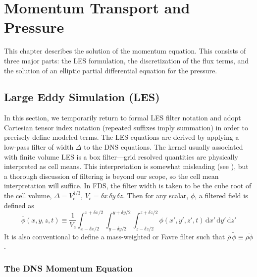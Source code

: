 \chapter{Momentum Transport and Pressure}
\label{momentum_chapter}

This chapter describes the solution of the momentum equation. This consists of three major parts: the LES formulation, the
discretization of the flux terms, and the solution of an elliptic partial differential equation for the pressure.

\section{Large Eddy Simulation (LES)}
\label{LES}

In this section, we temporarily return to formal LES filter notation and adopt Cartesian tensor index notation (repeated suffixes imply summation) in order to precisely define modeled terms. The LES equations are derived by applying a low-pass filter of width $\Delta$ to the DNS equations. The kernel usually associated with finite volume LES is a box filter---grid resolved quantities are physically interpreted as cell means.  This interpretation is somewhat misleading (see \cite{McDermott:2005b}), but a thorough discussion of filtering is beyond our scope, so the cell mean interpretation will suffice.  In FDS, the filter width is taken to be the cube root of the cell volume, $\Delta = V_c^{1/3}$, $V_c = \delta x \,\delta y\, \delta z$.  Then for any scalar, $\phi$, a filtered field is defined as
\begin{equation}
\label{eqn_box_filter}
\overline{\phi}(x,y,z,t) \equiv \frac{1}{V_c} \int_{x - \delta x/2}^{x + \delta x/2}\int_{y - \delta y/2}^{y + \delta y/2}\int_{z - \delta z/2}^{z + \delta z/2} \phi(x',y',z',t) \,\mbox{d} x' \,\mbox{d} y' \,\mbox{d} z' 
\end{equation}
It is also conventional to define a mass-weighted or Favre filter such that $\overline{\rho}\,\widetilde{\phi} \equiv \overline{\rho \phi}$.

\subsection{The DNS Momentum Equation}

